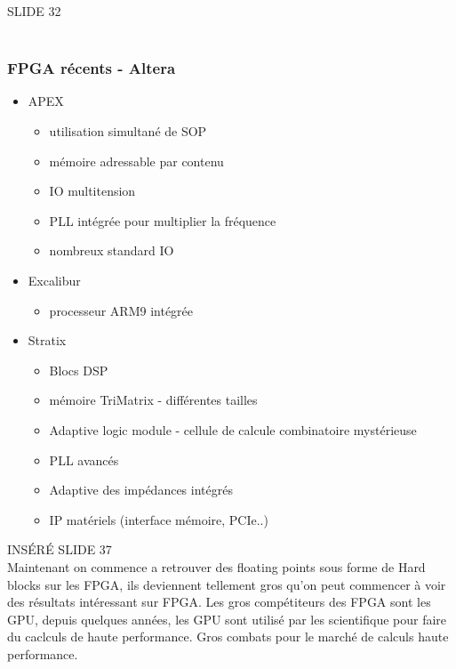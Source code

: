 \documentclass[oneside]{book}
\begin{document}
        SLIDE 32\\
        \\
        \subsubsection{FPGA récents - Altera}
        \begin{itemize}
            \item APEX
            \begin{itemize}
                \item utilisation simultané de SOP
                \item mémoire adressable par contenu
                \item IO multitension
                \item PLL intégrée pour multiplier la fréquence
                \item nombreux standard IO
            \end{itemize}
            \item Excalibur
            \begin{itemize}
                \item processeur ARM9 intégrée
            \end{itemize}
            \item Stratix
            \begin{itemize}
                \item Blocs DSP
                \item mémoire TriMatrix - différentes tailles
                \item Adaptive logic module - cellule de calcule combinatoire mystérieuse
                \item PLL avancés
                \item Adaptive des impédances intégrés
                \item IP matériels (interface mémoire, PCIe..)
            \end{itemize}
        \end{itemize}
    INSÉRÉ SLIDE 37\\
    
    Maintenant on commence a retrouver des floating points sous forme de Hard blocks sur les FPGA, ils deviennent tellement gros qu'on peut commencer à voir des résultats intéressant sur FPGA. Les gros compétiteurs des FPGA sont les GPU, depuis quelques années, les GPU sont utilisé par les scientifique pour faire du caclculs de haute performance. Gros combats pour le marché de calculs haute performance.\\
    
\end{document}

